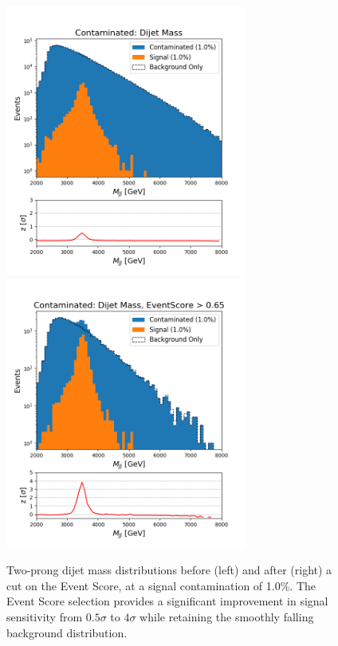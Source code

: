 \documentclass[12pt, a4paper]{article}
\begin{document}
\begin{figure}[H]
	\begin{center}
		\includegraphics[width=225pt]{imgs/bugfix/2Prong_Contaminated_1p0_JJ_Mass_Multi_SaveForPaper_Lead.png}
		\includegraphics[width=225pt]{imgs/bugfix/2Prong_Contaminated_1p0_JJ_Mass_EventScore0p65_Multi_SaveForPaper_Lead.png}
	\end{center}
	\caption{Two-prong dijet mass distributions before (left) and after (right) a cut on the Event Score, at a signal contamination of 1.0\%. The Event Score selection provides a significant improvement in signal sensitivity from $0.5\sigma$ to $4\sigma$ while retaining the smoothly falling background distribution.}
	\label{fig:2p_dijet}
\end{figure}
\end{document}
